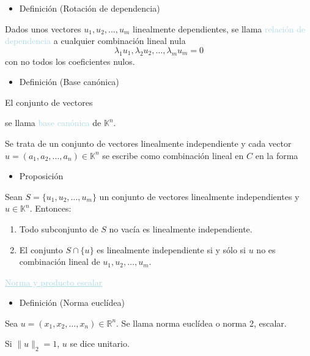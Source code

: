 \documentclass[12pt]{article}
\begin{document}
\begin{itemize}[label=\color{red}\textbullet, leftmargin=*]
\item \color{lightblue} Definición (Rotación de dependencia)\end{itemize}
Dados unos vectores $u_1,u_2,\hdots,u_m$ linealmente
dependientes, se llama \textcolor{lightblue}{relación de
dependencia} a cualquier combinación lineal nula
\[\lambda_1u_1,\lambda_2 u_2,\hdots,\lambda_mu_m=0\] con no
todos los coeficientes nulos.
\begin{itemize}[label=\color{red}\textbullet, leftmargin=*]
    \item \color{lightblue} Definición (Base canónica)
\end{itemize}
El conjunto de vectores \begin{center}
\end{center} se llama \textcolor{lightblue}{base canónica} de
$\mathbb{K}^n$.

Se trata de un conjunto de vectores linealmente independiente y
cada vector $u=(a_1,a_2,\hdots,a_n)\in\mathbb{K}^n$ se escribe
como combinación lineal en $C$ en la forma

\begin{itemize}[label=\color{red}\textbullet, leftmargin=*]
    \item \color{lightblue} Proposición
\end{itemize}
Sean $S=\{u_1,u_2,\hdots,u_m\}$ un conjunto de vectores
linealmente independientes y $u\in\mathbb{K}^n$. Entonces:
\begin{enumerate}
\item Todo subconjunto de $S$ no vacía es linealmente
independiente.
\item El conjunto $S\cap\{u\}$ es linealmente independiente si y
sólo si $u$ no es combinación lineal de $u_1,u_2,\hdots,u_m$.
\end{enumerate}
\textcolor{lightblue}{\underline{Norma y producto escalar}}
\begin{itemize}[label=\color{red}\textbullet, leftmargin=*]
    \item \color{lightblue} Definición (Norma euclídea)
\end{itemize}
Sea $u=(x_1,x_2,\hdots,x_n)\in\mathbb{R}^n$. Se llama norma
euclídea o norma 2, escalar.
\begin{center}
\end{center}
Si $\|u\|_2=1$, $u$ se dice unitario.
\end{document}
